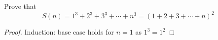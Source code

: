 \begin{statement}{2}
  Prove that
  \[
  S(n) = 1^3 + 2^3 + 3^3 + \cdots + n^3 = (1 + 2+ 3+\cdots+n)^2
  \]
\end{statement}
\begin{proof}
Induction: base case holds for $n=1$ as $1^3 = 1^2$


\end{proof}
